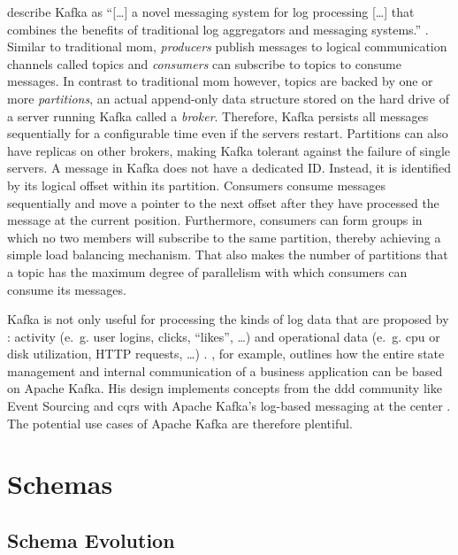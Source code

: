 \citeauthor{kreps_kafka_2011} describe Kafka as \enquote{[\ldots] a novel messaging system for log processing [\ldots] that combines the benefits of traditional log aggregators and messaging systems.} \parencite{kreps_kafka_2011}.
Similar to traditional \gls{mom}, \emph{producers} publish messages to logical communication channels called topics and \emph{consumers} can subscribe to topics to consume messages.
In contrast to traditional \gls{mom} however, topics are backed by one or more \emph{partitions}, an actual append-only data structure stored on the hard drive of a server running Kafka called a \emph{broker}.
Therefore, Kafka persists all messages sequentially for a configurable time even if the servers restart.
Partitions can also have replicas on other brokers, making Kafka tolerant against the failure of single servers.
A message in Kafka does not have a dedicated ID.
Instead, it is identified by its logical offset within its partition.
Consumers consume messages sequentially and move a pointer to the next offset after they have processed the message at the current position.
Furthermore, consumers can form groups in which no two members will subscribe to the same partition, thereby achieving a simple load balancing mechanism.
That also makes the number of partitions that a topic has the maximum degree of parallelism with which consumers can consume its messages.
\parencite{kreps_kafka_2011}

Kafka is not only useful for processing the kinds of log data that are proposed by \citeauthor{kreps_kafka_2011}: activity (e.~g. user logins, clicks, \enquote{likes}, \ldots) and operational data (e.~g. \gls{cpu} or disk utilization, HTTP requests, \ldots) \parencite{kreps_kafka_2011}.
\citeauthor{stopford_designing_2018}, for example, outlines how the entire state management and internal communication of a business application can be based on Apache Kafka.
His design implements concepts from the \gls{ddd} community like Event Sourcing \parencite{fowler_event_sourcing_2005} and \gls{cqrs} \parencite{fowler_cqrs_2011} with Apache Kafka's log-based messaging at the center \parencite{stopford_designing_2018}.
The potential use cases of Apache Kafka are therefore plentiful.

\section{Schemas}

\subsection{Schema Evolution}


